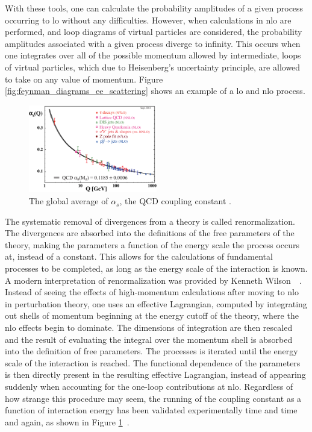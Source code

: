 \par With these tools, one can calculate the probability amplitudes of
a given process occurring to \acrfull{lo} without any
difficulties.  However, when calculations in \acrfull{nlo} are
performed, and loop diagrams of virtual particles are considered, the
probability amplitudes associated with a given process diverge to
infinity.  This occurs when one integrates over all of the 
possible momentum allowed by intermediate, loops of virtual particles,
which due to Heisenberg's uncertainty principle, are allowed to take
on any value of momentum.  Figure
\ref{fig:feynman_diagrams_ee_scattering} shows an example of a
\acrshort{lo} and \acrshort{nlo} process.

\begin{figure}[h]
  \centering
  \includegraphics[width=0.5\textwidth]{Figures/Experimental_Results/asq-2013.eps}
  \caption{The global average of $\alpha_{s}$, the QCD coupling
    constant \cite{Bethke_WorldAvgAlphaS_QCD}.}\label{fig:globalAvgAlphaS}
\end{figure}

\par The systematic removal of divergences from a theory is called
renormalization.  The divergences are absorbed into the
definitions of the free parameters of the theory, making the parameters a function of
the energy scale the process occurs at, instead of a constant.  This
allows for the calculations of fundamental processes to be completed,
as long as the energy scale of the interaction is known.  A modern
interpretation of renormalization was provided by Kenneth
Wilson~\cite{th:Wilson_renormalization1}~\cite{th:Wilson_renormalization2}.
Instead of seeing the effects of high-momentum calculations after
moving to \acrshort{nlo} in perturbation theory, one uses an effective Lagrangian,
computed by integrating out shells of momentum beginning at the energy
cutoff of the theory, where the \acrshort{nlo} effects begin to
dominate.  The dimensions of integration are then rescaled and the
result of evaluating the integral over the momentum shell is absorbed
into the definition of free parameters.  The processes is iterated
until the energy scale of the interaction is reached.  The functional 
dependence of the parameters is then  directly present in the resulting
effective Lagrangian, instead of appearing suddenly when accounting
for the one-loop contributions at \acrshort{nlo}.  Regardless of how
strange this procedure may seem, the running of the coupling constant as a
function of interaction energy has been validated experimentally time
and time and again, as shown in Figure \ref{fig:globalAvgAlphaS}~\cite{Bethke_WorldAvgAlphaS_QCD}.


